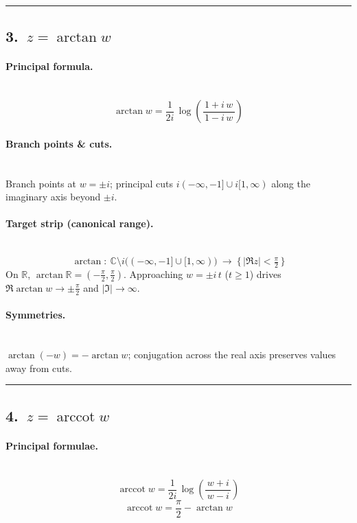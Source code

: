 \documentclass[11pt]{article}
\newcommand{\BoxEq}[1]{\begin{equation*}\boxed{\displaystyle #1}\end{equation*}}
\DeclareMathOperator{\arccot}{arccot}
\begin{document}
\bigskip\hrule\bigskip

\subsection*{3.\ $z=\arctan w$}

\paragraph{Principal formula.}\mbox{}\\[2pt]
\BoxEq{ \arctan w = \frac{1}{2i}\,\log\!\left(\frac{1+i\,w}{\,1-i\,w\,}\right) }

\paragraph{Branch points \& cuts.}\mbox{}\\[2pt]
Branch points at $w=\pm i$; principal cuts $i(-\infty,-1]\cup i[1,\infty)$ along the imaginary axis beyond $\pm i$.

\paragraph{Target strip (canonical range).}\mbox{}\\[2pt]
\BoxEq{ \arctan:\ \mathbb C\setminus i\big((-\infty,-1]\cup[1,\infty)\big)\ \longrightarrow\ \{\,|\Re z|<\tfrac{\pi}{2}\,\} }
On $\mathbb R$, $\arctan \mathbb R=(-\tfrac{\pi}{2},\tfrac{\pi}{2})$.
Approaching $w=\pm i\,t$ ($t\ge1$) drives $\Re \arctan w\to \pm\tfrac{\pi}{2}$ and $|\Im|\to\infty$.

\paragraph{Symmetries.}\mbox{}\\[2pt]
$\arctan(-w)=-\arctan w$; conjugation across the real axis preserves values away from cuts.

\bigskip\hrule\bigskip

\subsection*{4.\ $z=\arccot w$}

\paragraph{Principal formulae.}\mbox{}\\[2pt]
\BoxEq{ \arccot w = \frac{1}{2i}\,\log\!\left(\frac{w+i}{\,w-i\,}\right) }
\BoxEq{ \arccot w = \frac{\pi}{2}-\arctan w }
\end{document}
